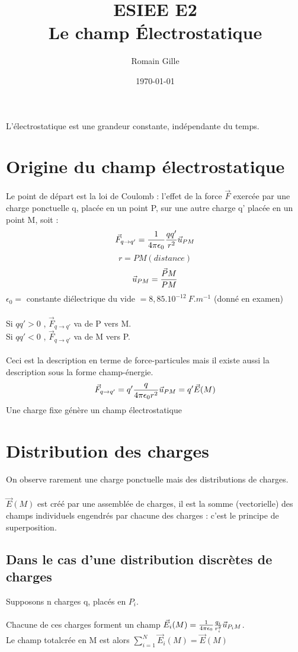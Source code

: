 \documentclass[11pt,a4paper,french]{article}
\title{ESIEE E2 \\Le champ Électrostatique}
\author{Romain Gille}
\date{\today}
\begin{document}
\maketitle
\newpage
L'électrostatique est une grandeur constante, indépendante du temps.
\section{Origine du champ électrostatique}
Le point de départ est la loi de Coulomb : l'effet de la force $\vec F$ exercée par une charge ponctuelle q, placée en un point P, sur une autre charge q' placée en un point M, soit : 
$$\vec F_{q \rightarrow q'} = {1 \over {4 \pi \epsilon_0}} {qq' \over r^2} \vec u_{PM}$$
$$r = PM(distance)$$
$$\vec u_{PM} = {\vec PM \over PM}$$
$\epsilon_0 = $ constante diélectrique du vide $ = 8,85.10^{-12}~ F.m^{-1}$ (donné en examen) \\ \\
Si $qq'>0$ , $\vec F_{q\rightarrow q'}$ va de P vers M.\\
Si $qq'<0$ , $\vec F_{q\rightarrow q'}$ va de M vers P. \\ \\
Ceci est la description en terme de force-particules mais il existe aussi la description sous la forme champ-énergie.
$$\vec F_{q \rightarrow q'} = q' {q \over 4 \pi \epsilon_0 r^2}\vec u_{PM}=q' \vec E(M)$$
Une charge fixe génère un champ électrostatique
\newpage
\section{Distribution des charges}
On observe rarement une charge ponctuelle mais des distributions de charges. \\ \\
$\vec E(M)$ est créé par une assemblée de charges, il est la somme (vectorielle) des champs individuels engendrés par chacune des charges : c'est le principe de superposition.
\subsection{Dans le cas d'une distribution discrètes de charges}
Supposons n charges q, placés en $P_i$. \\ \\
Chacune de ces charges forment un champ $\vec E_i(M)= {1 \over {4 \pi \epsilon_0}} {q_i \over r_i^2} \vec u_{P_i M}$. \\
Le champ totalcrée en M est alors $\displaystyle\sum_{i=1}^{N} \vec E_i(M) = \vec E(M)$
\end{document}
